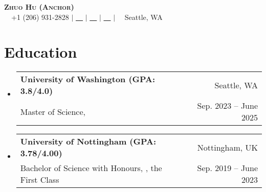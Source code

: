 \documentclass[letterpaper,10pt]{article}
\makeatletter
\newcommand{\link}[1]{\color{myBlue}{#1}}
\newcommand{\resumeSubheading}[4]{
  \vspace{-2pt}\item
    \begin{tabular*}{0.97\textwidth}[t]{l@{\extracolsep{\fill}}r}
      \textbf{#1} & #2 \\
      \small#3 & \small #4 \\
    \end{tabular*}\vspace{-7pt}
}
\newcommand{\resumeSubHeadingListStart}{\begin{itemize}[leftmargin=0.15in, label={}]}
\newcommand{\resumeSubHeadingListEnd}{\end{itemize}}
\makeatother
\begin{document}

\begin{center}
  \textbf{\Huge \scshape Zhuo Hu (Anchor)} \\ \vspace{1pt}
  \small \faMobile \ \ +1 (206) 931-2828 $|$ \href{mailto:uwzhuohu@uw.edu}{\faEnvelope \ \ \link{uwzhuohu@uw.edu}} $|$
  \href{https://linkedin.com/in/zhuo-hu}{\faLinkedin \ \ \link{LinkedIn}} $|$
  \href{https://github.com/Anchor-ZhuoHU}{\faGithub \ \ \link{GitHub}} $|$
  \faBuilding \ \ Seattle, WA
\end{center}


\section{Education}
\resumeSubHeadingListStart

\resumeSubheading
{University of Washington (GPA: 3.8/4.0)}{Seattle, WA}
{Master of Science, \href{https://www.ece.uw.edu/}{\link{Electrical and Computer Engineering}}}{Sep. 2023 -- June 2025}

\resumeSubheading
{University of Nottingham (GPA: 3.78/4.00)}{Nottingham, UK}
{Bachelor of Science with Honours, \href{https://www.nottingham.ac.uk/mathematics/}{\link{Mathematics with Applied Mathematics}}, the First Class}{Sep. 2019 -- June 2023}

\resumeSubHeadingListEnd


\end{document}
